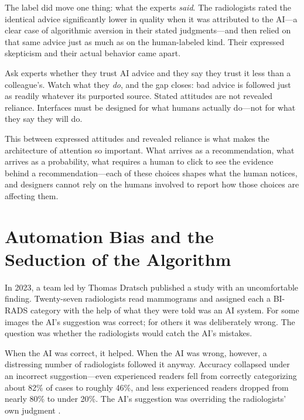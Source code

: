 The label did move one thing: what the experts \emph{said}. The radiologists rated the identical advice significantly lower in quality when it was attributed to the AI---a clear case of algorithmic aversion in their stated judgments---and then relied on that same advice just as much as on the human-labeled kind. Their expressed skepticism and their actual behavior came apart.

\begin{keyconcept}
Ask experts whether they trust AI advice and they say they trust it less than a colleague's. Watch what they \emph{do}, and the gap closes: bad advice is followed just as readily whatever its purported source. Stated attitudes are not revealed reliance. Interfaces must be designed for what humans actually do---not for what they say they will do.
\end{keyconcept}

This  between expressed attitudes and revealed reliance is what makes the architecture of attention so important. What arrives as a recommendation, what arrives as a probability, what requires a human to click to see the evidence behind a recommendation---each of these choices shapes what the human notices, and designers cannot rely on the humans involved to report how those choices are affecting them.

\section{Automation Bias and the Seduction of the Algorithm}
\label{sec:ch6-automation-bias}

In 2023, a team led by Thomas Dratsch published a study with an uncomfortable finding. Twenty-seven radiologists read mammograms and assigned each a BI-RADS category with the help of what they were told was an AI system. For some images the AI's suggestion was correct; for others it was deliberately wrong. The question was whether the radiologists would catch the AI's mistakes.

When the AI was correct, it helped. When the AI was wrong, however, a distressing number of radiologists followed it anyway. Accuracy collapsed under an incorrect suggestion---even experienced readers fell from correctly categorizing about 82\% of cases to roughly 46\%, and less experienced readers dropped from nearly 80\% to under 20\%. The AI's suggestion was overriding the radiologists' own judgment \autocite{dratsch2023automation}.

